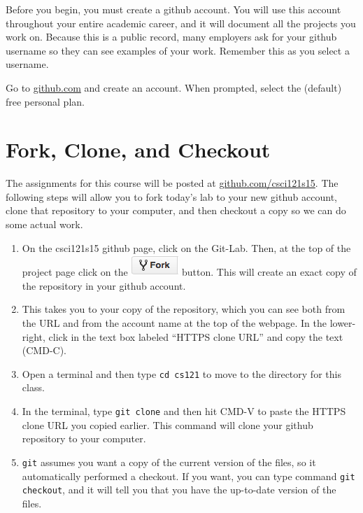 \documentclass[11pt]{article}
\begin{document}
Before you begin, you must create a github account.  You will use this account throughout your entire academic career, and it will document all the projects you work on.  Because this is a public record, many employers ask for your github username so they can see examples of your work.  Remember this as you select a username.

Go to \url{github.com} and create an account.  When prompted, select the (default) free personal plan.

\section*{Fork, Clone, and Checkout}

The assignments for this course will be posted at \url{github.com/csci121s15}.  The following steps will allow you to fork today's lab to your new github account, clone that repository to your computer, and then checkout a copy so we can do some actual work.

\begin{enumerate}
\item On the csci121s15 github page, click on the Git-Lab.  Then, at the top of the project page click on the \includegraphics[scale=.5]{fork} button.  This will create an exact copy of the repository in your github account.

\item This takes you to your copy of the repository, which you can see both from the URL and from the account name at the top of the webpage.  In the lower-right, click in the text box labeled ``HTTPS clone URL'' and copy the text (CMD-C).

\item Open a terminal and then type {\tt cd cs121} to move to the directory for this class.

\item In the terminal, type {\tt git clone} and then hit CMD-V to paste the HTTPS clone URL you copied earlier.  This command will clone your github repository to your computer.

\item {\tt git} assumes you want a copy of the current version of the files, so it automatically performed a checkout.  If you want, you can type command {\tt git checkout}, and it will tell you that you have the up-to-date version of the files.
\end{enumerate}
\end{document}
